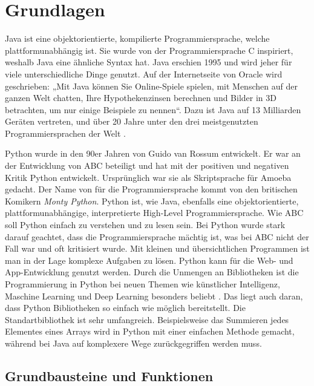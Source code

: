 
\chapter{Grundlagen}

Java ist eine objektorientierte, kompilierte Programmiersprache, welche plattformunabhängig ist. Sie wurde von der Programmiersprache C inspiriert, weshalb Java eine ähnliche Syntax hat. Java erschien 1995 und wird jeher für viele unterschiedliche Dinge genutzt. Auf der Internetseite von Oracle wird geschrieben: „Mit Java können Sie Online-Spiele spielen, mit Menschen auf der ganzen Welt chatten, Ihre Hypothekenzinsen berechnen und Bilder in 3D betrachten, um nur einige Beispiele zu nennen“\cite{Oracle:Java}. Dazu ist Java auf 13 Milliarden Geräten vertreten, und über 20 Jahre unter den drei meistgenutzten Programmiersprachen der Welt \cite{Github:PYPL}. \cite{Louis:2010}\cite{Oracle:Twitter} \par
Python wurde in den 90er Jahren von Guido van Rossum entwickelt. Er war an der Entwicklung von ABC beteiligt und hat mit der positiven und negativen Kritik Python entwickelt. Ursprünglich war sie als Skriptsprache für Amoeba gedacht. Der Name von für die Programmiersprache kommt von den britischen Komikern \textit{Monty Python}. Python ist, wie Java, ebenfalls eine objektorientierte, plattformunabhängige, interpretierte High-Level Programmiersprache. Wie ABC soll Python einfach zu verstehen und zu lesen sein. Bei Python wurde stark darauf geachtet, dass die Programmiersprache mächtig ist, was bei ABC nicht der Fall war und oft kritisiert wurde. Mit kleinen und übersichtlichen Programmen ist man in der Lage komplexe Aufgaben zu lösen. Python kann für die Web- und App-Entwicklung genutzt werden. Durch die Unmengen an Bibliotheken ist die Programmierung in Python bei neuen Themen wie künstlicher Intelligenz, Maschine Learning und Deep Learning besonders beliebt \cite{PythonCS}. Das liegt auch daran, dass Python Bibliotheken so einfach wie möglich bereitstellt. Die Standartbibliothek ist sehr umfangreich. Beispielsweise das Summieren jedes Elementes eines Arrays wird in Python mit einer einfachen Methode gemacht, während bei Java auf komplexere Wege zurückgegriffen werden muss. \cite{Python3:Buch}

\section{Grundbausteine und Funktionen}

